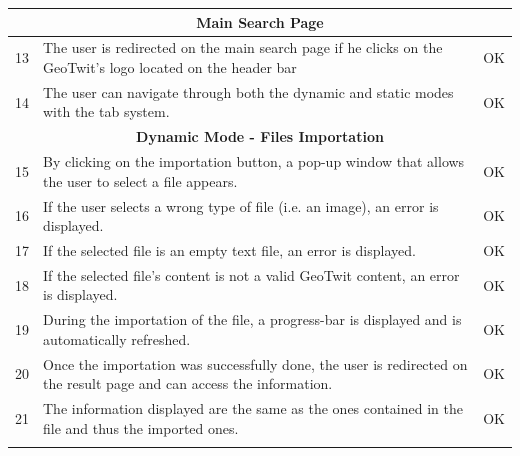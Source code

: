 \documentclass[a4paper,11pt]{report}
\begin{document}
\begin{center}
\begin{longtable}{|l|p{10cm}|p{4.4cm}|}
	\multicolumn{3}{|c|}{\textbf{Main Search Page}}\\\hline		
	13 & The user is redirected on the main search page if he clicks on the GeoTwit's logo located on the header bar & \color{ForestGreen}OK\color{black}\\\hline
	14 & The user can navigate through both the dynamic and static modes with the tab system. & \color{ForestGreen}OK\color{black}\\\hline
	
	\multicolumn{3}{|c|}{\textbf{Dynamic Mode - Files Importation}}\\\hline		15 & By clicking on the importation button, a pop-up window that allows the user to select a file appears. & \color{ForestGreen}OK\color{black}\\\hline
	16 & If the user selects a wrong type of file (i.e. an image), an error is displayed. & \color{ForestGreen}OK\color{black}\\\hline
	17 & If the selected file is an empty text file, an error is displayed. & \color{ForestGreen}OK\color{black}\\\hline
	18 & If the selected file's content is not a valid GeoTwit content, an error is displayed. & \color{ForestGreen}OK\color{black}\\\hline
	19 & During the importation of the file, a progress-bar is displayed and is automatically refreshed. & \color{ForestGreen}OK\color{black}\\\hline
	20 & Once the importation was successfully done, the user is redirected on the result page and can access the information. & \color{ForestGreen}OK\color{black}\\\hline
	21 & The information displayed are the same as the ones contained in the file and thus the imported ones. & \color{ForestGreen}OK\color{black}\\\hline
	\newpage
	

\end{longtable}
\end{center}
\end{document}
